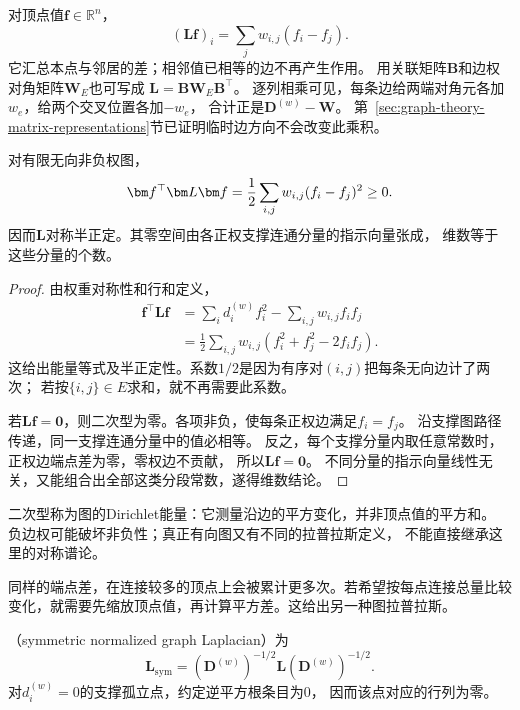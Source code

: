 对顶点值\(\bm f\in\mathbb R^n\)，
\[
  (\bm L\bm f)_i=\sum_jw_{i,j}(f_i-f_j).
\]
它汇总本点与邻居的差；相邻值已相等的边不再产生作用。
用关联矩阵\(\bm B\)和边权对角矩阵\(\bm W_E\)也可写成
\(\bm L=\bm B\bm W_E\bm B^\top\)。
逐列相乘可见，每条边给两端对角元各加\(w_e\)，给两个交叉位置各加\(-w_e\)，
合计正是\(\bm D^{(w)}-\bm W\)。
第~\ref{sec:graph-theory-matrix-representations}节已证明临时边方向不会改变此乘积。

\begin{theorem}[图拉普拉斯的Dirichlet能量与零空间]
  \label{thm:graph-theory-laplacian-energy-nullspace}
  对有限无向非负权图，
  \begingroup
  \let\graphenergylabel\label
  \begin{equation}
    \let\label\graphenergylabel
    \bm f^\top\bm L\bm f
    =\frac12\sum_{i,j}w_{i,j}(f_i-f_j)^2\geq0.
    \label{eq:graph-theory-dirichlet-energy}
    \label{eq:signal-analysis-graph-dirichlet-energy}
  \end{equation}
  \endgroup
  因而\(\bm L\)对称半正定。其零空间由各正权支撑连通分量的指示向量张成，
  维数等于这些分量的个数。
\end{theorem}

\begin{proof}
由权重对称性和行和定义，
\begin{align*}
  \bm f^\top\bm L\bm f
  &=\sum_i d_i^{(w)}f_i^2-\sum_{i,j}w_{i,j}f_if_j\\
  &=\frac12\sum_{i,j}w_{i,j}(f_i^2+f_j^2-2f_if_j).
\end{align*}
这给出能量等式及半正定性。系数\(1/2\)是因为有序对\((i,j)\)把每条无向边计了两次；
若按\(\{i,j\}\in E\)求和，就不再需要此系数。

若\(\bm L\bm f=\bm0\)，则二次型为零。各项非负，使每条正权边满足\(f_i=f_j\)。
沿支撑图路径传递，同一支撑连通分量中的值必相等。
反之，每个支撑分量内取任意常数时，正权边端点差为零，零权边不贡献，
所以\(\bm L\bm f=\bm0\)。
不同分量的指示向量线性无关，又能组合出全部这类分段常数，遂得维数结论。
\end{proof}

二次型称为图的Dirichlet能量：它测量沿边的平方变化，并非顶点值的平方和。
负边权可能破坏非负性；真正有向图又有不同的拉普拉斯定义，
不能直接继承这里的对称谱论。

同样的端点差，在连接较多的顶点上会被累计更多次。若希望按每点连接总量比较
变化，就需要先缩放顶点值，再计算平方差。这给出另一种图拉普拉斯。
\begin{definition}[对称归一化拉普拉斯]
  \label{def:graph-theory-normalized-laplacian}
  （symmetric normalized graph Laplacian）为
  \begin{equation}
    \bm L_{\mathrm{sym}}
    =(\bm D^{(w)})^{-1/2}\bm L(\bm D^{(w)})^{-1/2}.
    \label{eq:graph-theory-normalized-laplacian}
  \end{equation}
  对\(d_i^{(w)}=0\)的支撑孤立点，约定逆平方根条目为\(0\)，
  因而该点对应的行列为零。
\end{definition}

